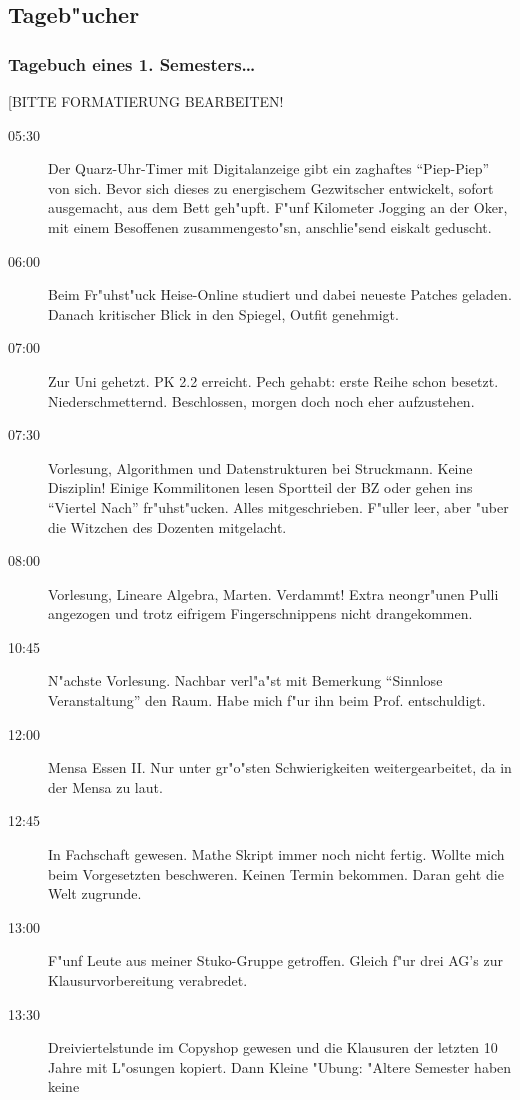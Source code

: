 \subsection{Tageb"ucher}
\subsubsection{Tagebuch eines 1. Semesters\ldots}
[BITTE FORMATIERUNG BEARBEITEN!

\begin{description}
\item[05:30] Der Quarz-Uhr-Timer mit Digitalanzeige gibt ein zaghaftes "`Piep-Piep"'
von sich. Bevor sich dieses zu energischem Gezwitscher entwickelt, sofort
ausgemacht, aus dem Bett geh"upft. F"unf Kilometer Jogging an der Oker,
mit einem Besoffenen zusammengesto"sn, anschlie"send eiskalt geduscht.
\item[06:00] Beim Fr"uhst"uck Heise-Online studiert und dabei neueste Patches geladen.
Danach kritischer Blick in den Spiegel, Outfit genehmigt.
\item[07:00] Zur Uni gehetzt. PK 2.2 erreicht. Pech gehabt: erste Reihe schon besetzt.
Niederschmetternd. Beschlossen, morgen doch noch eher aufzustehen.
\item[07:30] Vorlesung, Algorithmen und Datenstrukturen bei Struckmann. Keine Disziplin!
Einige Kommilitonen lesen
Sportteil der BZ oder gehen ins "`Viertel Nach"' fr"uhst"ucken. Alles
mitgeschrieben. F"uller leer, aber "uber die Witzchen des Dozenten mitgelacht.
\item[08:00] Vorlesung, Lineare Algebra, Marten. Verdammt! Extra neongr"unen Pulli
angezogen und trotz eifrigem Fingerschnippens nicht drangekommen.
\item[10:45] N"achste Vorlesung. Nachbar verl"a"st mit Bemerkung "`Sinnlose
Veranstaltung"' den Raum. Habe mich f"ur ihn beim Prof. entschuldigt.
\item[12:00] Mensa Essen II. Nur unter gr"o"sten Schwierigkeiten
weitergearbeitet, da in der Mensa zu laut.
\item[12:45] In Fachschaft gewesen. Mathe Skript immer noch nicht fertig. Wollte
mich beim Vorgesetzten beschweren. Keinen Termin bekommen. Daran geht die
Welt zugrunde.
\item[13:00] F"unf Leute aus meiner Stuko-Gruppe getroffen. Gleich f"ur drei AG's zur
Klausurvorbereitung verabredet.
\item[13:30] Dreiviertelstunde im Copyshop gewesen und die Klausuren der letzten 10
Jahre mit L"osungen kopiert. Dann Kleine "Ubung: "Altere Semester haben keine

\end{description}

